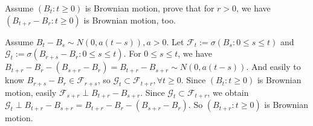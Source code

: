 \documentclass{ctexart}
\newif\ifpreface
\begin{document}
\large
\iffalse
  \setlength{\baselineskip}{1.2em}
  \ifpreface
    
  \else
    \maketitle
  \fi
\fi
{}
\begin{problem}\label{pro:1}
  Assume \((B_t:t \geq 0)\) is Brownian motion, prove that for \(r>0\), we have \((B_{t + r}-B_r:t \geq 0)\) is Brownian motion, too.
\end{problem}
\begin{solution}
  Assume \(B_t-B_s \sim N(0,a(t-s)),a >0\).
  Let \(\mathcal{F}_t:=\sigma(B_s:0 \leq s \leq t)\) and \(\mathcal{G}_t:=\sigma(B_{r+s}-B_r:0 \leq s \leq t)\).
  For \(0 \leq s \leq t\), we have \(B_{t+r}-B_r -(B_{s+r}-B_r)=B_{t+r}-B_{s+r} \sim N(0,a(t-s))\).
  And easily to know \(B_{r + s}-B_r \in \mathcal{F}_{r+s}\), so \(\mathcal{G}_t \subset \mathcal{F}_{t+r},\forall t \geq 0\).
  Since \((B_t:t \geq 0)\) is Brownian motion, easily \(\mathcal{F}_{s+r} \perp B_{t+r}-B_{s+r}\).
  Since \(\mathcal{G}_{t}\subset \mathcal{F}_{t +r}\), we obtain \(\mathcal{G}_t \perp B_{t + r}-B_{s + r}=B_{t+r}-B_r -(B_{s+r}-B_r)\).
  So \((B_{t+r}:t \geq 0)\) is Brownian motion.
\end{solution}
\end{document}
